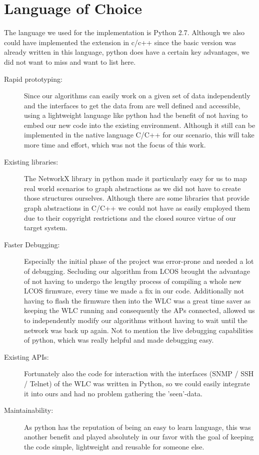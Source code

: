   \section{Language of Choice}
    The language we used for the implementation is Python 2.7.
    Although we also could have implemented the extension in c/c++ since the basic version was already written in this language,
    python does have a certain key advantages, we did not want to miss and want to list here.
    
    \begin{description}
      \item [Rapid prototyping:]
	Since our algorithms can easily work on a given set of data independently and the interfaces to get the data from are well defined and accessible,
	using a lightweight language like python had the benefit of not having to embed our new code into the existing environment. 
	Although it still can be implemented in the native language C/C++ for our scenario, this will take more time and effort, which was not the focus of this work.
      \item[Existing libraries:]
	The NetworkX library in python made it particularly easy for us to map real world scenarios to graph abstractions as we did not have to create those structures ourselves.
	Although there are some libraries that provide graph abstractions in C/C++ we could not have as easily employed them due to their copyright restrictions and 
	the closed source virtue of our target system.
      \item[Faster Debugging:]
	Especially the initial phase of the project was error-prone and needed a lot of debugging.
	Secluding our algorithm from \ac{LCOS} brought the advantage of not having to undergo the lengthy process of compiling a whole new LCOS firmware,
	every time we made a fix in our code.
	Additionally not having to flash the firmware then into the \ac{WLC} was a great time saver as keeping the \ac{WLC} running and consequently the APs connected,
	allowed us to independently modify our algorithms without having to wait until the network was back up again. 
	Not to mention the live debugging capabilities of python, which was really helpful and made debugging easy.
      \item[Existing APIs:]
	Fortunately also the code for interaction with the interfaces (\ac{SNMP} / \ac{SSH} / Telnet) of the \ac{WLC} was written in Python,
	so we could easily integrate it into ours and had no problem gathering the 'seen'-data.
      \item[Maintainability:]
	As python has the reputation of being an easy to learn language, this was another benefit and played absolutely in our favor with the goal of
	keeping the code simple, lightweight and reusable for someone else.
    \end{description}
    
